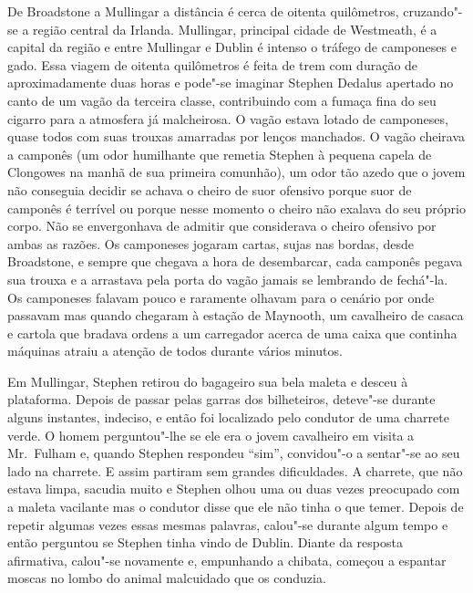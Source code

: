 De Broadstone a Mullingar a distância é cerca de oitenta
quilômetros, cruzando"-se a região central da Irlanda.  Mullingar,
principal cidade de Westmeath, é a capital da região e entre Mullingar
e Dublin é intenso o tráfego de camponeses e gado.  Essa viagem de
oitenta quilômetros é feita de trem com duração de aproximadamente duas
horas e pode"-se imaginar Stephen Dedalus apertado no canto de um vagão
da terceira classe, contribuindo com a fumaça fina do seu cigarro para
a atmosfera já malcheirosa.  O vagão estava lotado de camponeses,
quase todos com suas trouxas amarradas por lenços manchados.  O vagão
cheirava a camponês (um odor humilhante que remetia Stephen à pequena
capela de Clongowes na manhã de sua primeira comunhão), um odor tão
azedo que o jovem não conseguia decidir se achava o cheiro de suor
ofensivo porque suor de camponês é terrível ou porque
nesse momento o cheiro não exalava do seu próprio corpo.  Não se
envergonhava de admitir que considerava o cheiro
ofensivo por ambas as razões.  Os camponeses jogaram cartas, sujas nas
bordas, desde Broadstone, e sempre que chegava a hora de desembarcar,
cada camponês pegava sua trouxa e a arrastava pela porta do vagão
jamais se lembrando de fechá"-la.  Os camponeses falavam pouco e
raramente olhavam para o cenário por onde passavam mas quando chegaram
à estação de Maynooth, um cavalheiro de casaca e cartola que bradava
ordens a um carregador acerca de uma caixa que continha máquinas atraiu
a atenção de todos durante vários minutos.

Em Mullingar, Stephen retirou do bagageiro sua bela maleta e desceu
à plataforma.  Depois de passar pelas garras dos bilheteiros, deteve"-se
durante alguns instantes, indeciso, e então foi localizado pelo
condutor de uma charrete verde.  O homem perguntou"-lhe se ele era o
jovem cavalheiro em visita a Mr.~Fulham e, quando Stephen respondeu
“sim”, convidou"-o a sentar"-se ao seu lado na charrete.  E assim
partiram sem grandes dificuldades.  A charrete, que não estava limpa,
sacudia muito e Stephen olhou uma ou duas vezes preocupado com a
maleta vacilante mas o condutor disse que ele não tinha o que temer. 
Depois de repetir algumas vezes essas mesmas palavras, calou"-se durante
algum tempo e então perguntou se Stephen tinha vindo de Dublin.  Diante
da resposta afirmativa, calou"-se novamente e, empunhando a chibata,
começou a espantar moscas no lombo do animal malcuidado que os
conduzia.

